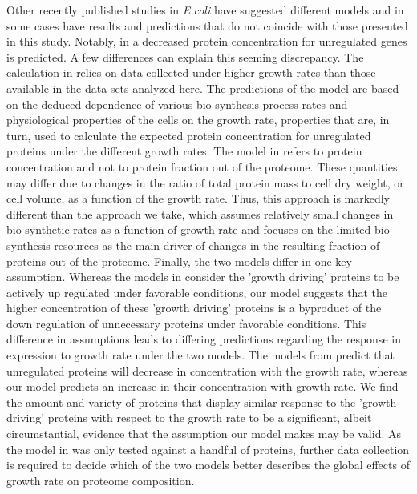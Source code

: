\documentclass[10pt,letterpaper]{article}
\begin{document}
Other recently published studies in \emph{E.coli} have suggested different models and in some cases have results  and predictions that do not coincide with those presented in this study.
Notably, in \cite{Klumpp2009,Klumpp2014} a decreased protein concentration for unregulated genes is predicted.
A few differences can explain this seeming discrepancy.
The calculation in \cite{Klumpp2009} relies on data collected under higher growth rates than those available in the data sets analyzed here.
The predictions of the model are based on the deduced dependence of various bio-synthesis process rates and physiological properties of the cells on the growth rate, properties that are, in turn, used to calculate the expected protein concentration for unregulated proteins under the different growth rates.
The model in \cite{Klumpp2009} refers to protein concentration and not to protein fraction out of the proteome. These quantities may differ due to changes in the ratio of total protein mass to cell dry weight, or cell volume, as a function of the growth rate.
Thus, this approach is markedly different than the approach we take, which assumes relatively small changes in bio-synthetic rates as a function of growth rate and focuses on the limited bio-synthesis resources as the main driver of changes in the resulting fraction of proteins out of the proteome.
Finally, the two models differ in one key assumption.
Whereas the models in \cite{Klumpp2009,Scott2010,Scott2011,Klumpp2014} consider the 'growth driving' proteins to be actively up regulated under favorable conditions, our model suggests that the higher concentration of these 'growth driving' proteins is a byproduct of the down regulation of unnecessary proteins under favorable conditions.
This difference in assumptions leads to differing predictions regarding the response in expression to growth rate under the two models.
The models from \cite{Klumpp2009,Scott2010,Scott2011,Klumpp2014} predict that unregulated proteins will decrease in concentration with the growth rate, whereas our model predicts an increase in their concentration with growth rate.
We find the amount and variety of proteins that display similar response to the 'growth driving' proteins with respect to the growth rate to be a significant, albeit circumstantial, evidence that the assumption our model makes may be valid.
As the model in \cite{Klumpp2009} was only tested against a handful of proteins, further data collection is required to decide which of the two models better describes the global effects of growth rate on proteome composition.
\end{document}
